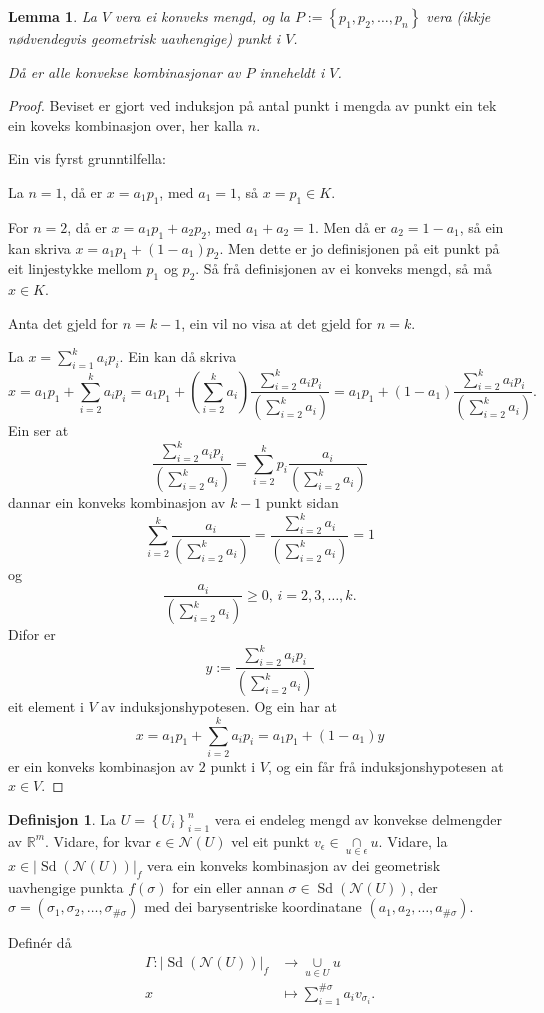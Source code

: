 \documentclass[a4paper, 12pt, norsk]{article}
\theoremstyle{plain}
\newtheorem{lemma}[theorem]{Lemma}
\theoremstyle{definition}
\newtheorem{definition}[theorem]{Definisjon}
\newcommand{\Rb}{\mathbb{R}}
\newcommand{\Nc}{\mathcal{N}}
\newcommand{\intersect}{ \mathop{\cap}\limits }
\newcommand{\union}{ \mathop{\cup}\limits }
\newcommand{\gr}[1]{ \lvert #1 \rvert } %
\newcommand{\set}[1]{ \left\{ #1 \right\} } %
\newcommand{\tuple}[1]{ \left( #1 \right) } %
\DeclareMathOperator{\Sd}{Sd} %
\begin{document}
\begin{lemma} \label{thm:konveks-kombinasjon-i-konveks}
	La \( V \) vera ei konveks mengd, og la \( P := \set{p_1, p_2, \dots, p_n } \) vera (ikkje nødvendegvis geometrisk uavhengige) punkt i \( V \).
	
	Då er alle konvekse kombinasjonar av \( P \) inneheldt i \( V \).
\end{lemma}

\begin{proof}
	Beviset er gjort ved induksjon på antal punkt i mengda av punkt ein tek ein koveks kombinasjon over, her kalla \( n \).

	Ein vis fyrst grunntilfella:

	La \( n = 1 \), då er \( x = a_1 p_1 \), med \( a_1 = 1 \), så \( x = p_1 \in K \).
	
	For \( n = 2 \), då er \( x = a_1 p_1 + a_2 p_2 \), med \( a_1 + a_2 = 1 \). Men då er \( a_2 = 1 - a_1 \), så ein kan skriva \( x = a_1 p_1 + (1-a_1) p_2 \). Men dette er jo definisjonen på eit punkt på eit linjestykke mellom \( p_1 \) og \( p_2 \). Så frå definisjonen av ei konveks mengd, så må \( x \in K \).

	Anta det gjeld for \( n = k-1 \), ein vil no visa at det gjeld for \( n = k \).

	La \( x = \sum_{i=1}^k a_i p_i \). Ein kan då skriva
	\[ 
		x = a_1 p_1 + \sum_{i=2}^k a_i p_i = a_1 p_1 + (\sum_{i=2}^k a_i) \frac{\sum_{i=2}^k a_i p_i}{(\sum_{i=2}^k a_i)} = a_1 p_1 + (1-a_1) \frac{\sum_{i=2}^k a_i p_i}{(\sum_{i=2}^k a_i)}.
	\]
	Ein ser at
	\[
		\frac{\sum_{i=2}^k a_i p_i}{(\sum_{i=2}^k a_i)} = \sum_{i=2}^k p_i\frac{a_i}{(\sum_{i=2}^k a_i)}
	\]
	dannar ein konveks kombinasjon av \( k-1 \) punkt sidan
	\[
		\sum_{i=2}^k \frac{a_i}{(\sum_{i=2}^k a_i)} = \frac{\sum_{i=2}^k a_i}{(\sum_{i=2}^k a_i)} = 1
	\]
	og
	\[
		\frac{a_i}{(\sum_{i=2}^k a_i)} \geq 0, \, i=2,3,\dots,k.
	\]
	Difor er
	\[
		y := \frac{\sum_{i=2}^k a_i p_i}{(\sum_{i=2}^k a_i)}
	\]
	eit element i \( V \) av induksjonshypotesen. Og ein har at
	\[
		x = a_1 p_1 + \sum_{i=2}^k a_i p_i = a_1 p_1 + (1-a_1) y
	\]
	er ein konveks kombinasjon av \( 2 \) punkt i \( V \), og ein får frå induksjonshypotesen at \( x \in V \).
\end{proof}

\begin{definition} \label{thm:Gamma}
	La \( U = \set{U_i}_{i=1}^n \) vera ei endeleg mengd av konvekse delmengder av \( \Rb^m \). Vidare, for kvar \( \epsilon \in \Nc(U) \) vel eit punkt \( v_\epsilon \in \intersect_{u \in \epsilon} u \). Vidare, la \( x \in \gr{\Sd(\Nc(U))}_f \) vera ein konveks kombinasjon av dei geometrisk uavhengige punkta \( f(\sigma) \) for ein eller annan \( \sigma \in \Sd(\Nc(U)) \), der \( \sigma = \tuple{\sigma_1, \sigma_2, \dots, \sigma_{\#\sigma}} \) med dei barysentriske koordinatane \( \tuple{a_1, a_2, \dots, a_{\#\sigma}} \).
	
	Definér då
	\begin{align*}
		\Gamma : \gr{\Sd(\Nc(U))}_f &\to \union_{u \in U} u \\
		x &\mapsto \sum_{i=1}^{\#\sigma} a_i v_{\sigma_i}.
	\end{align*}
\end{definition}
\end{document}

